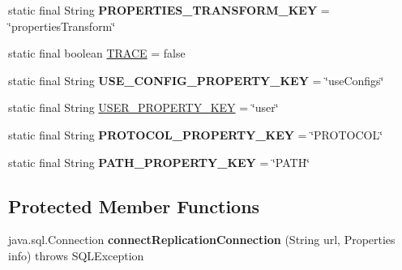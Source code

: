 \begin{DoxyCompactItemize}
\item 
\mbox{\label{classcom_1_1mysql_1_1jdbc_1_1_non_registering_driver_a14c48e46ce5768cb0fb4ce4f14c1f8e4}} 
static final String {\bfseries P\+R\+O\+P\+E\+R\+T\+I\+E\+S\+\_\+\+T\+R\+A\+N\+S\+F\+O\+R\+M\+\_\+\+K\+EY} = \char`\"{}properties\+Transform\char`\"{}
\item 
static final boolean \mbox{\hyperlink{classcom_1_1mysql_1_1jdbc_1_1_non_registering_driver_ad02b7e726a4bb40575dd1dc18fa836a6}{T\+R\+A\+CE}} = false
\item 
\mbox{\label{classcom_1_1mysql_1_1jdbc_1_1_non_registering_driver_a6b5b2bf3776da0df6743ea1c8f7f8887}} 
static final String {\bfseries U\+S\+E\+\_\+\+C\+O\+N\+F\+I\+G\+\_\+\+P\+R\+O\+P\+E\+R\+T\+Y\+\_\+\+K\+EY} = \char`\"{}use\+Configs\char`\"{}
\item 
static final String \mbox{\hyperlink{classcom_1_1mysql_1_1jdbc_1_1_non_registering_driver_aac9ec3832a08f0712f3527cbcaa025a4}{U\+S\+E\+R\+\_\+\+P\+R\+O\+P\+E\+R\+T\+Y\+\_\+\+K\+EY}} = \char`\"{}user\char`\"{}
\item 
\mbox{\label{classcom_1_1mysql_1_1jdbc_1_1_non_registering_driver_a7968b335b94fc0abe25fb4f68820f0ba}} 
static final String {\bfseries P\+R\+O\+T\+O\+C\+O\+L\+\_\+\+P\+R\+O\+P\+E\+R\+T\+Y\+\_\+\+K\+EY} = \char`\"{}P\+R\+O\+T\+O\+C\+OL\char`\"{}
\item 
\mbox{\label{classcom_1_1mysql_1_1jdbc_1_1_non_registering_driver_a0cc92f93a9dac74867e38eecccee6fea}} 
static final String {\bfseries P\+A\+T\+H\+\_\+\+P\+R\+O\+P\+E\+R\+T\+Y\+\_\+\+K\+EY} = \char`\"{}P\+A\+TH\char`\"{}
\end{DoxyCompactItemize}
\subsection*{Protected Member Functions}
\begin{DoxyCompactItemize}
\item 
\mbox{\label{classcom_1_1mysql_1_1jdbc_1_1_non_registering_driver_a8c7617a4d60bf88d47359934717dfe79}} 
java.\+sql.\+Connection {\bfseries connect\+Replication\+Connection} (String url, Properties info)  throws S\+Q\+L\+Exception 
\end{DoxyCompactItemize}

